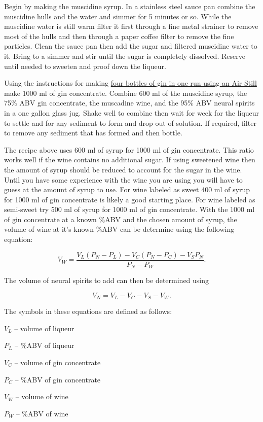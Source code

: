 \documentclass[letterpaper]{recipePMG}
\begin{document}
Begin by making the muscidine syrup. In a stainless steel sauce pan combine the muscidine hulls and the water and simmer for 5 minutes or so.  While the muscidine water is still warm filter it first through a fine metal strainer to remove most of the hulls and then through a paper coffee filter to remove the fine particles. Clean the sauce pan then add the sugar and filtered muscidine water to it. Bring to a simmer and stir until the sugar is completely dissolved. Reserve until needed to sweeten and proof down the liqueur. 

Using the instructions for making \hyperref[ConcentrationMethod]{four bottles of gin in one run using an Air Still} make 1000 ml of gin concentrate.  Combine 600 ml of the muscidine syrup,
the  75\% ABV gin concentrate, the muscadine wine, and the 95\% ABV neural spirits in a one gallon glass jug. Shake well to combine then wait for week for the liqueur to settle and for any sediment to form and drop out of solution. If required, filter to remove any sediment that has formed and then bottle.

The recipe above uses 600 ml of syrup for 1000 ml of gin concentrate. This ratio works well if the wine contains no additional sugar. If using sweetened wine then the amount of syrup should be reduced to account for the sugar in the wine.  Until you have some experience with the wine you are using you will have to guess at the amount of syrup to use. For wine labeled as sweet 400 ml of syrup for 1000 ml of gin concentrate is likely a good starting place. For wine labeled as semi-sweet try 500 ml of syrup for 1000 ml of gin concentrate. With the 1000 ml of gin concentrate at a known \%ABV and the chosen amount of syrup, the volume of wine at it's known \%ABV can be determine using the following equation:

$$V_W = \frac{V_L(P_N-P_L) - V_C(P_N-P_C) - V_S P_N}{P_N - P_W}.$$

The volume of neural spirits to add can then be determined using

$$V_N=V_L-V_C-V_S-V_W .$$

The symbols in these equations are defined as follows: 

$V_L$ -- volume of liqueur

$P_L$  --  \%ABV of liqueur

$V_C$  -- volume of gin concentrate

$P_C$  --  \%ABV  of gin concentrate

$V_W$ --  volume of wine

$P_W$  --  \%ABV  of wine
\end{document}
